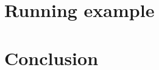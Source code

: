 \documentclass[runningheads]{llncs}
\begin{document}



\section{Running example}



\section{Conclusion} \label{sec:conclusion}

 

\end{document}

